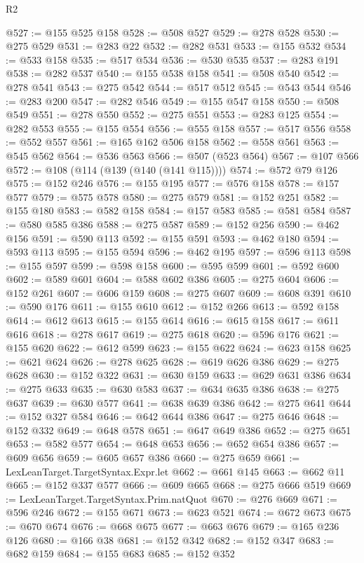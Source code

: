 \begin{lexlean}{R2}
\begin{coremodule}
@527 := @155 @525 @158
@528 := @508 @527
@529 := @278 @528
@530 := @275 @529
@531 := @283 @22
@532 := @282 @531
@533 := @155 @532
@534 := @533 @158
@535 := @517 @534
@536 := @530 @535
@537 := @283 @191
@538 := @282 @537
@540 := @155 @538 @158
@541 := @508 @540
@542 := @278 @541
@543 := @275 @542
@544 := @517 @512
@545 := @543 @544
@546 := @283 @200
@547 := @282 @546
@549 := @155 @547 @158
@550 := @508 @549
@551 := @278 @550
@552 := @275 @551
@553 := @283 @125
@554 := @282 @553
@555 := @155 @554
@556 := @555 @158
@557 := @517 @556
@558 := @552 @557
@561 := @165 @162 @506 @158
@562 := @558 @561
@563 := @545 @562
@564 := @536 @563
@566 := @507 (@523 @564)
@567 := @107 @566
@572 := @108 (@114 (@139 (@140 (@141 @115))))
@574 := @572 @79 @126
@575 := @152 @246
@576 := @155 @195
@577 := @576 @158
@578 := @157 @577
@579 := @575 @578
@580 := @275 @579
@581 := @152 @251
@582 := @155 @180
@583 := @582 @158
@584 := @157 @583
@585 := @581 @584
@587 := @580 @585 @386
@588 := @275 @587
@589 := @152 @256
@590 := @462 @156
@591 := @590 @113
@592 := @155 @591
@593 := @462 @180
@594 := @593 @113
@595 := @155 @594
@596 := @462 @195
@597 := @596 @113
@598 := @155 @597
@599 := @598 @158
@600 := @595 @599
@601 := @592 @600
@602 := @589 @601
@604 := @588 @602 @386
@605 := @275 @604
@606 := @152 @261
@607 := @606 @159
@608 := @275 @607
@609 := @608 @391
@610 := @590 @176
@611 := @155 @610
@612 := @152 @266
@613 := @592 @158
@614 := @612 @613
@615 := @155 @614
@616 := @615 @158
@617 := @611 @616
@618 := @278 @617
@619 := @275 @618
@620 := @596 @176
@621 := @155 @620
@622 := @612 @599
@623 := @155 @622
@624 := @623 @158
@625 := @621 @624
@626 := @278 @625
@628 := @619 @626 @386
@629 := @275 @628
@630 := @152 @322
@631 := @630 @159
@633 := @629 @631 @386
@634 := @275 @633
@635 := @630 @583
@637 := @634 @635 @386
@638 := @275 @637
@639 := @630 @577
@641 := @638 @639 @386
@642 := @275 @641
@644 := @152 @327 @584
@646 := @642 @644 @386
@647 := @275 @646
@648 := @152 @332
@649 := @648 @578
@651 := @647 @649 @386
@652 := @275 @651
@653 := @582 @577
@654 := @648 @653
@656 := @652 @654 @386
@657 := @609 @656
@659 := @605 @657 @386
@660 := @275 @659
@661 := LexLeanTarget.TargetSyntax.Expr.let
@662 := @661 @145
@663 := @662 @11
@665 := @152 @337 @577
@666 := @609 @665
@668 := @275 @666 @519
@669 := LexLeanTarget.TargetSyntax.Prim.natQuot
@670 := @276 @669
@671 := @596 @246
@672 := @155 @671
@673 := @623 @521
@674 := @672 @673
@675 := @670 @674
@676 := @668 @675
@677 := @663 @676
@679 := @165 @236 @126
@680 := @166 @38
@681 := @152 @342
@682 := @152 @347
@683 := @682 @159
@684 := @155 @683
@685 := @152 @352

\end{coremodule}
\end{lexlean}

